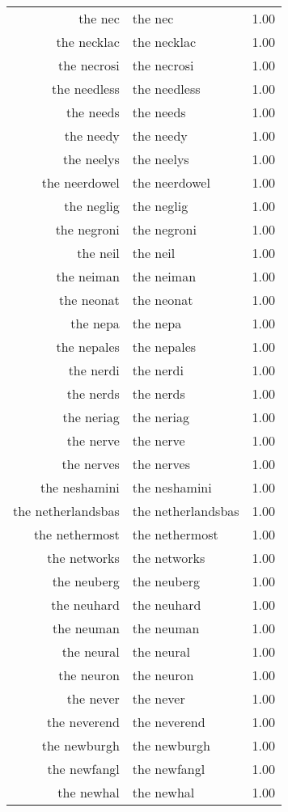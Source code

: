 \begin{table}[ht]
\begin{tabular}{rlr}
  the nec & the nec & 1.00 \\ 
  the necklac & the necklac & 1.00 \\ 
  the necrosi & the necrosi & 1.00 \\ 
  the needless & the needless & 1.00 \\ 
  the needs & the needs & 1.00 \\ 
  the needy & the needy & 1.00 \\ 
  the neelys & the neelys & 1.00 \\ 
  the neerdowel & the neerdowel & 1.00 \\ 
  the neglig & the neglig & 1.00 \\ 
  the negroni & the negroni & 1.00 \\ 
  the neil & the neil & 1.00 \\ 
  the neiman & the neiman & 1.00 \\ 
  the neonat & the neonat & 1.00 \\ 
  the nepa & the nepa & 1.00 \\ 
  the nepales & the nepales & 1.00 \\ 
  the nerdi & the nerdi & 1.00 \\ 
  the nerds & the nerds & 1.00 \\ 
  the neriag & the neriag & 1.00 \\ 
  the nerve & the nerve & 1.00 \\ 
  the nerves & the nerves & 1.00 \\ 
  the neshamini & the neshamini & 1.00 \\ 
  the netherlandsbas & the netherlandsbas & 1.00 \\ 
  the nethermost & the nethermost & 1.00 \\ 
  the networks & the networks & 1.00 \\ 
  the neuberg & the neuberg & 1.00 \\ 
  the neuhard & the neuhard & 1.00 \\ 
  the neuman & the neuman & 1.00 \\ 
  the neural & the neural & 1.00 \\ 
  the neuron & the neuron & 1.00 \\ 
  the never & the never & 1.00 \\ 
  the neverend & the neverend & 1.00 \\ 
  the newburgh & the newburgh & 1.00 \\ 
  the newfangl & the newfangl & 1.00 \\ 
  the newhal & the newhal & 1.00 \\ 

\end{tabular}
\end{table}
